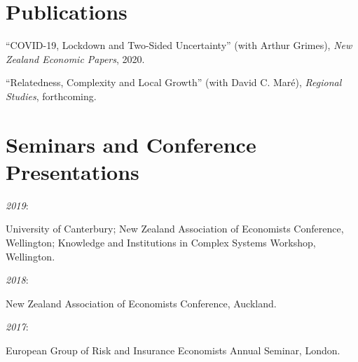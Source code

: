 \documentclass[11pt,oneside]{memoir}
\newcommand{\entry}[1]{\par\hangindent=0.4in #1}
\begin{document}
	\section{Publications}
	
		\entry{``COVID-19, Lockdown and Two-Sided Uncertainty'' (with Arthur Grimes), \emph{New Zealand Economic Papers}, 2020.}
		\entry{``Relatedness, Complexity and Local Growth'' (with David C. Maré), \emph{Regional Studies}, forthcoming.}
	
	\section{Seminars and Conference Presentations}
	
		\entry{\parbox[b]{0.4in}{\emph{2019}: }University of Canterbury; New Zealand Association of Economists Conference, Wellington; Knowledge and Institutions in Complex Systems Workshop, Wellington.}
		\entry{\parbox[b]{0.4in}{\emph{2018}: }New Zealand Association of Economists Conference, Auckland.}
		\entry{\parbox[b]{0.4in}{\emph{2017}: }European Group of Risk and Insurance Economists Annual Seminar, London.}
\end{document}

